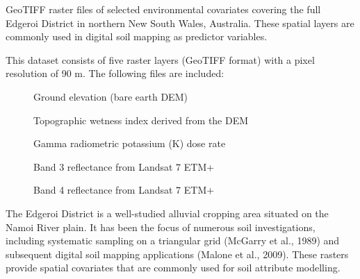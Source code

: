 \documentclass[a4paper]{book}
\begin{document}
%
\begin{Description}
GeoTIFF raster files of selected environmental covariates covering the full Edgeroi District in northern New South Wales, Australia. These spatial layers are commonly used in digital soil mapping as predictor variables.
\end{Description}
%
\begin{Format}
This dataset consists of five raster layers (GeoTIFF format) with a pixel resolution of 90 m. The following files are included:
\begin{description}

\item[] Ground elevation (bare earth DEM)
\item[] Topographic wetness index derived from the DEM
\item[] Gamma radiometric potassium (K) dose rate
\item[] Band 3 reflectance from Landsat 7 ETM+
\item[] Band 4 reflectance from Landsat 7 ETM+

\end{description}

\end{Format}
%
\begin{Details}
The Edgeroi District is a well-studied alluvial cropping area situated on the Namoi River plain. It has been the focus of numerous soil investigations, including systematic sampling on a triangular grid (McGarry et al., 1989) and subsequent digital soil mapping applications (Malone et al., 2009). These rasters provide spatial covariates that are commonly used for soil attribute modelling.
\end{Details}
\end{document}
